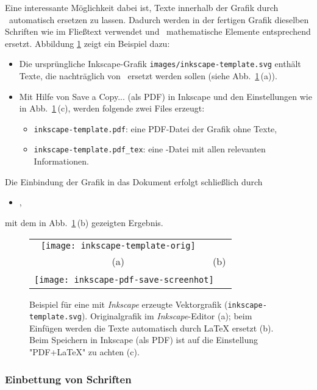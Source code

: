 Eine interessante Möglichkeit dabei ist, Texte innerhalb der Grafik
durch \latex\ automatisch ersetzen zu lassen.
Dadurch werden in der fertigen Grafik dieselben Schriften wie im Fließtext
verwendet und \va\ mathematische Elemente entsprechend ersetzt.
Abbildung \ref{fig:InkscapeExample} zeigt ein Beispiel dazu:
%
\begin{itemize}
\item
Die ursprüngliche Inkscape-Grafik \nolinkurl{images/inkscape-template.svg}  enthält
Texte, die nachträglich von \latex\ ersetzt werden sollen 
(siehe Abb.~\ref{fig:InkscapeExample}\,(a)).
\item
Mit Hilfe von \textsf{Save a Copy...} (als PDF) in Inkscape und den Einstellungen wie in 
Abb.~\ref{fig:InkscapeExample}\,(c), werden folgende zwei Files erzeugt:
\begin{itemize}
\item[] \nolinkurl{inkscape-template.pdf}: eine PDF-Datei der Grafik ohne Texte, 
\item[] \nolinkurl{inkscape-template.pdf_tex}: eine \latex-Datei mit allen relevanten Informationen.
\end{itemize}
\end{itemize}
%
Die Einbindung der Grafik in das Dokument erfolgt schließlich durch
\begin{itemize}
\item[] \verb!!,
\end{itemize}
mit dem in Abb.~\ref{fig:InkscapeExample}\,(b) gezeigten Ergebnis.



\begin{figure}
\centering\small
\begin{tabular}{cc}
\texttt{[image: inkscape-template-orig]} &

\\
(a) & (b)
\\[6pt]
\multicolumn{2}{c}{\texttt{[image: inkscape-pdf-save-screenhot]}%
~~\raisebox{25mm}{(c)}}
\end{tabular}
\caption{Beispiel für eine mit \emph{Inkscape} erzeugte Vektorgrafik
(\nolinkurl{inkscape-template.svg}).
Originalgrafik im \textit{Inkscape}-Editor (a);
beim Einfügen werden die Texte automatisch durch LaTeX ersetzt (b).
Beim Speichern in Inkscape (als PDF) ist auf die Einstellung "PDF+LaTeX" zu achten (c).}
\label{fig:InkscapeExample}
\end{figure}


\subsubsection{Einbettung von Schriften}

